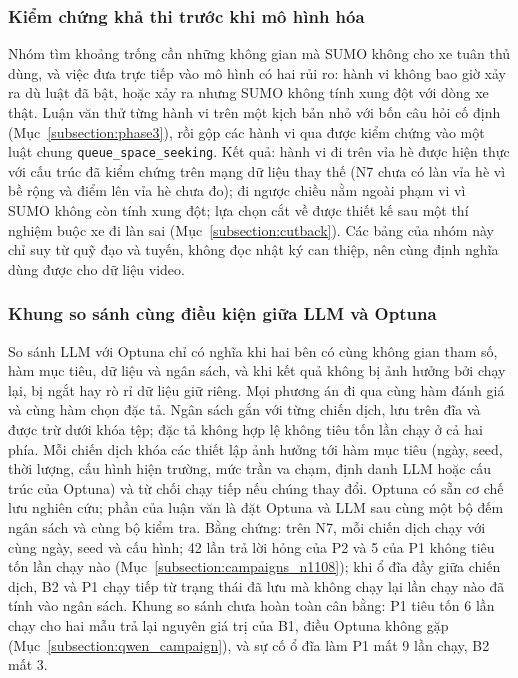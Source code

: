 \documentclass[../main.tex]{subfiles}
\begin{document}
\subsubsection{Kiểm chứng khả thi trước khi mô hình hóa}
\label{section:5.6}

Nhóm tìm khoảng trống cần những không gian mà SUMO không cho xe tuân thủ dùng, và việc đưa trực tiếp vào mô hình có hai rủi ro: hành vi không bao giờ xảy ra dù luật đã bật, hoặc xảy ra nhưng SUMO không tính xung đột với dòng xe thật. Luận văn thử từng hành vi trên một kịch bản nhỏ với bốn câu hỏi cố định (Mục~\ref{subsection:phase3}), rồi gộp các hành vi qua được kiểm chứng vào một luật chung \texttt{queue\_space\_seeking}. Kết quả: hành vi đi trên vỉa hè được hiện thực với cấu trúc đã kiểm chứng trên mạng dữ liệu thay thế (N7 chưa có làn vỉa hè vì bề rộng và điểm lên vỉa hè chưa đo); đi ngược chiều nằm ngoài phạm vi vì SUMO không còn tính xung đột; lựa chọn cắt về được thiết kế sau một thí nghiệm buộc xe đi làn sai (Mục~\ref{subsection:cutback}). Các bảng của nhóm này chỉ suy từ quỹ đạo và tuyến, không đọc nhật ký can thiệp, nên cùng định nghĩa dùng được cho dữ liệu video.

\subsubsection{Khung so sánh cùng điều kiện giữa LLM và Optuna}
\label{section:5.7}

So sánh LLM với Optuna chỉ có nghĩa khi hai bên có cùng không gian tham số, hàm mục tiêu, dữ liệu và ngân sách, và khi kết quả không bị ảnh hưởng bởi chạy lại, bị ngắt hay rò rỉ dữ liệu giữ riêng. Mọi phương án đi qua cùng hàm đánh giá và cùng hàm chọn đặc tả. Ngân sách gắn với từng chiến dịch, lưu trên đĩa và được trừ dưới khóa tệp; đặc tả không hợp lệ không tiêu tốn lần chạy ở cả hai phía. Mỗi chiến dịch khóa các thiết lập ảnh hưởng tới hàm mục tiêu (ngày, seed, thời lượng, cấu hình hiện trường, mức trần va chạm, định danh LLM hoặc cấu trúc của Optuna) và từ chối chạy tiếp nếu chúng thay đổi. Optuna có sẵn cơ chế lưu nghiên cứu; phần của luận văn là đặt Optuna và LLM sau cùng một bộ đếm ngân sách và cùng bộ kiểm tra. Bằng chứng: trên N7, mỗi chiến dịch chạy với cùng ngày, seed và cấu hình; 42 lần trả lời hỏng của P2 và 5 của P1 không tiêu tốn lần chạy nào (Mục~\ref{subsection:campaigns_n1108}); khi ổ đĩa đầy giữa chiến dịch, B2 và P1 chạy tiếp từ trạng thái đã lưu mà không chạy lại lần chạy nào đã tính vào ngân sách. Khung so sánh chưa hoàn toàn cân bằng: P1 tiêu tốn 6 lần chạy cho hai mẫu trả lại nguyên giá trị của B1, điều Optuna không gặp (Mục~\ref{subsection:qwen_campaign}), và sự cố ổ đĩa làm P1 mất 9 lần chạy, B2 mất 3.
\end{document}

